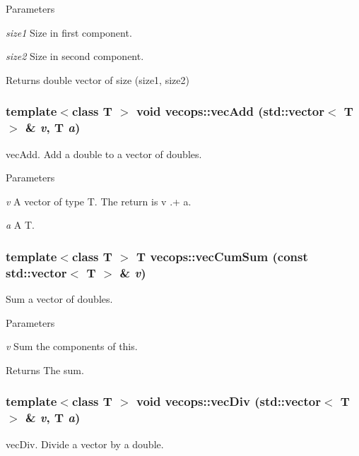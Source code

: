 \begin{DoxyParams}{Parameters}
\item[{\em size1}]Size in first component. \item[{\em size2}]Size in second component. \end{DoxyParams}
\begin{DoxyReturn}{Returns}
double vector of size (size1, size2) 
\end{DoxyReturn}
\hypertarget{namespacevecops_a7b580307abbce16deb2805fe8ba71373}{
\subsubsection[{vecAdd}]{\setlength{\rightskip}{0pt plus 5cm}template$<$class T $>$ void vecops::vecAdd (std::vector$<$ T $>$ \& {\em v}, \/  T {\em a})}}
\label{namespacevecops_a7b580307abbce16deb2805fe8ba71373}
vecAdd. Add a double to a vector of doubles.


\begin{DoxyParams}{Parameters}
\item[{\em v}]A vector of type T. The return is v .+ a. \item[{\em a}]A T. \end{DoxyParams}
\hypertarget{namespacevecops_a8cdfcdb8afb9e355fab4565c9a6293c1}{
\subsubsection[{vecCumSum}]{\setlength{\rightskip}{0pt plus 5cm}template$<$class T $>$ T vecops::vecCumSum (const std::vector$<$ T $>$ \& {\em v})}}
\label{namespacevecops_a8cdfcdb8afb9e355fab4565c9a6293c1}
Sum a vector of doubles.


\begin{DoxyParams}{Parameters}
\item[{\em v}]Sum the components of this. \end{DoxyParams}
\begin{DoxyReturn}{Returns}
The sum. 
\end{DoxyReturn}
\hypertarget{namespacevecops_acec04644239d63fa4a301827c628ce0d}{
\subsubsection[{vecDiv}]{\setlength{\rightskip}{0pt plus 5cm}template$<$class T $>$ void vecops::vecDiv (std::vector$<$ T $>$ \& {\em v}, \/  T {\em a})}}
\label{namespacevecops_acec04644239d63fa4a301827c628ce0d}
vecDiv. Divide a vector by a double.


